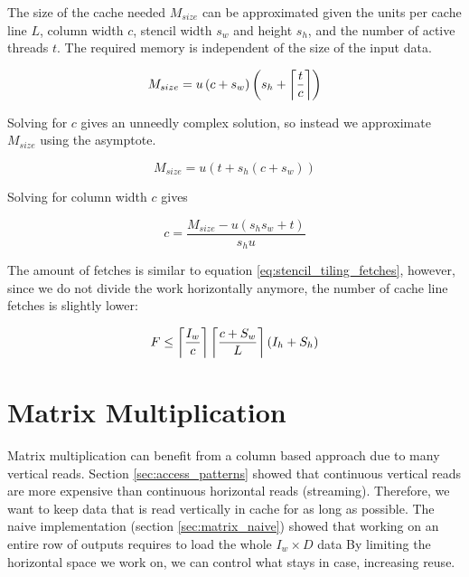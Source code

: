 The size of the cache needed $M_{size}$ can be approximated given the units per cache line $L$, column width $c$, stencil width $s_{w}$ and height $s_{h}$, and the number of active threads $t$. The required memory is independent of the size of the input data.

\[
    M_{size} = u \left(c + s_w\right) \left(s_h + \left\lceil \frac{t}{c} \right\rceil\right)
\]

Solving for $c$ gives an unneedly complex solution, so instead we approximate $M_{size}$ using the asymptote.

\[
    M_{size} = u \left(t + s_h \left(c + s_w\right)\right)
\]

Solving for column width $c$ gives 

\[
    c = \frac{M_{size} - u (s_h s_w + t)}{s_h u}
\]

The amount of fetches is similar to equation \ref{eq:stencil_tiling_fetches}, however, since we do not divide the work horizontally anymore, the number of cache line fetches is slightly lower:

\begin{equation}
    F \leq \left\lceil \frac{I_w}{c} \right\rceil\left\lceil \frac{c + S_w}{L} \right\rceil (I_h + S_h)
    \label{eq:stencil_column_fetches}
\end{equation}

\section{Matrix Multiplication}
Matrix multiplication can benefit from a column based approach due to many vertical reads.
Section \ref{sec:access_patterns} showed that continuous vertical reads are more expensive than continuous horizontal reads (streaming).
Therefore, we want to keep data that is read vertically in cache for as long as possible.
The naive implementation (section \ref{sec:matrix_naive}) showed that working on an entire row of outputs requires to load the whole $I_w \times D$ data
By limiting the horizontal space we work on, we can control what stays in case, increasing reuse.

